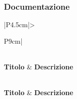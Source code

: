 \subsubsection{Documentazione}

\bgroup
\begin{adjustwidth}{-0.5cm}{-0.5cm}
  \begin{longtable}{|P{4.5cm}|>{\raggedright\arraybackslash}P{9cm}|}
    \caption{Checklist - Documentazione}
  	\label{tab:check-documentazione} \\
    \hline
		\textbf{Titolo} & \textbf{Descrizione} \\ 
		\hline
		\endfirsthead

    \caption[]{Checklist - Documentazione (continua)} \\
		\hline
		\textbf{Titolo} & \textbf{Descrizione} \\ 
		\hline
		\endhead

		\hline
		 \\ 
		\hline
		\endfoot

		\hline
		\endlastfoot


\end{longtable}
\end{adjustwidth}
